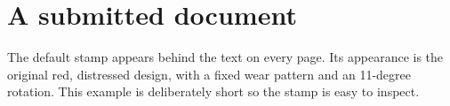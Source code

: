 \documentclass[11pt]{article}
\begin{document}
\section*{A submitted document}
The default stamp appears behind the text on every page. Its appearance is
the original red, distressed design, with a fixed wear pattern and an
11-degree rotation.
\vfill
This example is deliberately short so the stamp is easy to inspect.
\end{document}
